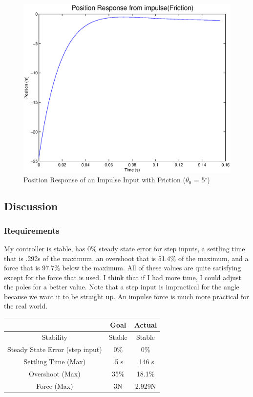 \documentclass{article}
\begin{document}
\begin{figure}[!htb]
    \centering
    \includegraphics[scale=0.6]{7}
    \caption{Position Response of an Impulse Input with Friction ($\theta_0$ = 5$^{\circ}$)}
\end{figure} 

\FloatBarrier

\subsection{Discussion}

\subsubsection{Requirements}

My controller is stable, has 0\% steady state error for step inputs, a settling time that is .292s of the maximum, an overshoot that is 51.4\% of the maximum, and a force that is 97.7\% below the maximum. All of these values are quite satisfying except for the force that is used. I think that if I had more time, I could adjust the poles for a better value. Note that a step input is impractical for the angle because we want it to be straight up. An impulse force is much more practical for the real world.

\begin{center}
\begin{tabular}{|c | c | c|} 
\hline
 & Goal & Actual \\ 
\hline
Stability &  Stable & Stable \\ 
\hline
Steady State Error (step input)  & 0\% & 0\% \\ 
\hline
Settling Time (Max) & .5 s & .146 s \\
\hline
Overshoot (Max)& 35\% & 18.1\% \\
\hline
Force (Max) & 3N & 2.929N \\
\hline
\end{tabular}
\end{center}
\end{document}
